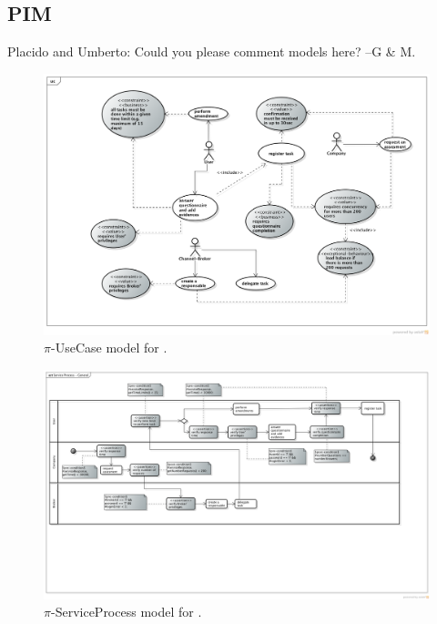 \subsection{PIM}


{\color{magenta} Placido and Umberto: Could you please comment models here? --G \& M.}


\begin{figure}
\centering
\includegraphics[width=1.0\textwidth]{figs/UseCaseGeneral.png}
\caption{$\pi$-UseCase model for \FlyingPig.\label{fig:piUseCaseModel}}
\end{figure}

\begin{figure}
\centering
\includegraphics[width=1.0\textwidth]{figs/ServiceProcessGeneral.png}
\caption{$\pi$-ServiceProcess model for \FlyingPig.\label{fig:PiServiceProcessModel}}
\end{figure}

